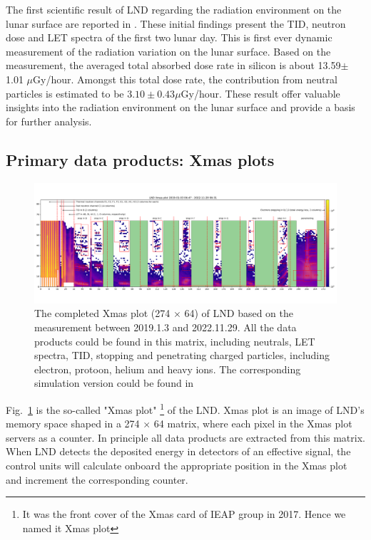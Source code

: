 The first scientific result of \ac{LND} regarding the radiation environment on the lunar surface are reported in \citep{Zhang-2020-LND-firstresults}. These initial findings present the \ac{TID}, neutron dose and \ac{LET} spectra of the first two lunar day. This is first ever dynamic measurement of the radiation variation on the lunar surface. Based on the measurement, the averaged total absorbed dose rate in silicon is about 13.59$\pm$1.01 $\mu$Gy/hour. Amongst this total dose rate, the contribution from neutral particles is estimated to be $3.10 \pm 0.43 \mu$Gy/hour. These result offer valuable insights into the radiation environment on the lunar surface and provide a basis for further analysis.



\subsection{Primary data products: Xmas plots}
\label{sec:xmas}

\begin{figure}
    \centering
    \includegraphics[width =\textheight, height = 0.6\textheight, angle = 90]{images/xmas-2019-01-03To2022-11-29.png}
    \caption[LND Xmas plot based on the measurement]{The completed Xmas plot (274 $\times$ 64) of \ac{LND} based on the measurement between 2019.1.3 and 2022.11.29. All the data products could be found in this matrix, including neutrals, \ac{LET} spectra, \ac{TID}, stopping and penetrating charged particles, including electron, protoon, helium and heavy ions. The corresponding simulation version could be found in \citep{Wimmer2020SSRv}}
    \label{Fig:measurement_Xmas}
\end{figure}

Fig.~\ref{Fig:measurement_Xmas} is the so-called "Xmas plot" \footnote{It was the front cover of the Xmas card of IEAP group in 2017. Hence we named it Xmas plot} of the \ac{LND}. Xmas plot is an image of \ac{LND}'s memory space shaped in a 274 $\times$ 64 matrix, where each pixel in the Xmas plot servers as a counter. In principle all data products are extracted from this matrix. 
When \ac{LND} detects the deposited energy in detectors of an effective signal, the control units will calculate onboard the appropriate position in the Xmas plot and increment the corresponding counter. 

